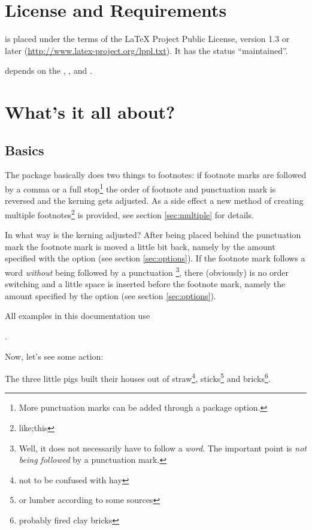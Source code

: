 \documentclass[toc=index,toc=bib]{cnpkgdoc}
\newcommand\setapart[1]{%
  \begin{quote}
   #1
  \end{quote}}
\begin{document}
\section{License and Requirements}
\fnpct is placed under the terms of the LaTeX Project Public License,
version 1.3 or later (\url{http://www.latex-project.org/lppl.txt}).
It has the status \enquote{maintained}.

\fnpct depends on the , ,  and
.

\section{What's it all about?}
\subsection{Basics}
The \fnpct package basically does two things to footnotes: if footnote marks are
followed by a comma or a full stop\footnote{More punctuation marks can be added
through a package option.} the order of footnote and punctuation mark is
reversed and the kerning gets adjusted. As a side effect a new method of creating
multiple footnotes\footnote{like;this} is provided, see section \ref{sec:multiple}
for details.

In what way is the kerning adjusted? After being placed behind the punctuation
mark the footnote mark is moved a little bit back, namely by the amount specified
with the option  (see section \ref{sec:options}). If the
footnote mark follows a word \emph{without} being followed by a punctuation%
\footnote{Well, it does not necessarily have to follow a \emph{word}. The important
point is \emph{not being followed} by a punctuation mark.}, there (obviously) is
no order switching and a little space is inserted before the footnote mark, namely
the amount specified by the option  (see section
\ref{sec:options}).

All examples in this documentation use

\setapart{\cmd{thempfootnote}{\cmd{arabic}{mpfootnote}}}.

Now, let's see some action:
\begin{beispiel}
 \begin{minipage}{.4\linewidth}
  \noindent The three little pigs built their houses
  out of straw\footnote{not to be confused with hay},
  sticks\footnote{or lumber according to some sources}
  and bricks\footnote{probably fired clay bricks}.
 \end{minipage}
\end{beispiel}
\end{document}
